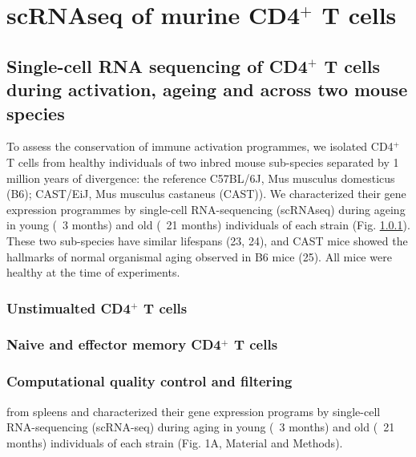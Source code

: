 
\section{scRNAseq of murine CD4$^+$ T cells}
\subsection*{Single-cell RNA sequencing of CD4$^+$ T cells during activation, ageing and across two mouse species}

To assess the conservation of immune activation programmes, we isolated CD4$^+$ T cells from healthy individuals of two inbred mouse sub-species separated by 1 million years of divergence: the reference C57BL/6J, Mus musculus domesticus (B6); CAST/EiJ, Mus musculus castaneus (CAST)). We characterized their gene expression programmes by single-cell RNA-sequencing (scRNAseq) during ageing in young (~3 months) and old (~21 months) individuals of each strain (Fig. \ref{}). These two sub-species have similar lifespans (23, 24), and CAST mice showed the hallmarks of normal organismal aging observed in B6 mice (25). All mice were healthy at the time of experiments. 

\subsubsection*{Unstimualted CD4$^+$ T cells}

\subsubsection{Naive and effector memory CD4$^+$ T cells}

\subsubsection*{Computational quality control and filtering}

from spleens and characterized their gene expression programs by single-cell RNA-sequencing (scRNA-seq) during aging in young (~3 months) and old (~21 months) individuals of each strain (Fig. 1A, Material and Methods).  

